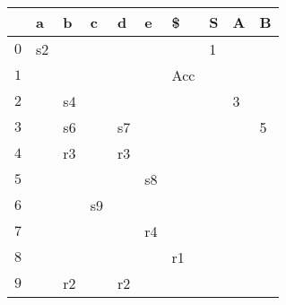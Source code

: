 \documentclass{standalone}
\providecommand\lightrule{%
	\arrayrulecolor{black!30}%
	\midrule[\lightrulewidth]%
	\arrayrulecolor{black}}
\begin{document}
\begin{tabularx}{\textwidth}{XXXXXXXXXX}
         & a & b & c & d & e & \$ & S & A & B \\
        \midrule
            \(0\) & s2 & & & & & & 1 & &
            \\ \lightrule
            \(1\) & & & & & & Acc & & &
            \\ \lightrule
            \(2\) & & s4 & & & & & & 3 &
            \\ \lightrule
            \(3\) & & s6 & & s7 & & & & & 5
            \\ \lightrule
            \(4\) & & r3 & & r3 & & & & &
            \\ \lightrule
            \(5\) & & & & & s8 & & & &
            \\ \lightrule
            \(6\) & & & s9 & & & & & &
            \\ \lightrule
            \(7\) & & & & & r4 & & & &
            \\ \lightrule
            \(8\) & & & & & & r1 & & &
            \\ \lightrule
            \(9\) & & r2 & & r2 & & & & &
\end{tabularx}
\end{document}
